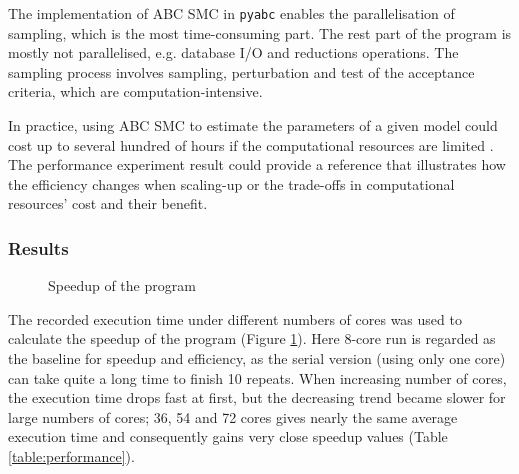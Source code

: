 The implementation of ABC SMC in \verb|pyabc| enables the parallelisation of sampling, which is the most time-consuming part. The rest part of the program is mostly not parallelised, e.g. database I/O and reductions operations. The sampling process involves sampling, perturbation and test of the acceptance criteria, which are computation-intensive.

In practice, using ABC SMC to estimate the parameters of a given model could cost up to several hundred of hours if the computational resources are limited \cite{ref:compare}. The performance experiment result could provide a reference that illustrates how the efficiency changes when scaling-up or the trade-offs in computational resources' cost and their benefit.

\subsubsection{Results}




\begin{figure}[h]
    \begin{center}
    \end{center}

    \caption[Speedup of the program]{Speedup of the program}
    \label{fig:speedup}
\end{figure}

The recorded execution time under different numbers of cores was used to calculate the speedup of the program (Figure \ref{fig:speedup}). Here 8-core run is regarded as the baseline for speedup and efficiency, as the serial version (using only one core) can take quite a long time to finish 10 repeats. When increasing number of cores, the execution time drops fast at first, but the decreasing trend became slower for large numbers of cores; 36, 54 and 72 cores gives nearly the same average execution time and consequently gains very close speedup values (Table \ref{table:performance}).

